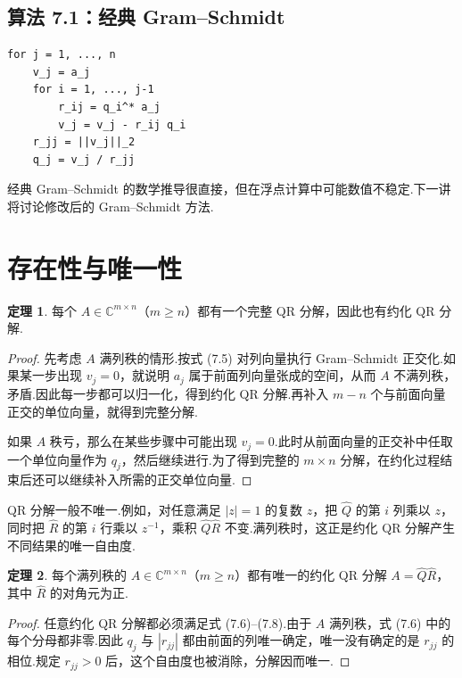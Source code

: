 \documentclass[UTF8,fontset=none,12pt]{ctexart}
\newcommand{\C}{\mathbb{C}}
\theoremstyle{definition}
\newtheorem{theorem}{定理}
\begin{document}
\subsection*{算法 7.1：经典 Gram--Schmidt}

\begin{verbatim}
for j = 1, ..., n
    v_j = a_j
    for i = 1, ..., j-1
        r_ij = q_i^* a_j
        v_j = v_j - r_ij q_i
    r_jj = ||v_j||_2
    q_j = v_j / r_jj
\end{verbatim}

经典 Gram--Schmidt 的数学推导很直接，但在浮点计算中可能数值不稳定.下一讲将讨论修改后的 Gram--Schmidt 方法.

\section*{存在性与唯一性}

\begin{theorem}
每个 $A\in\C^{m\times n}$（$m\ge n$）都有一个完整 QR 分解，因此也有约化 QR 分解.
\end{theorem}

\begin{proof}
先考虑 $A$ 满列秩的情形.按式 (7.5) 对列向量执行 Gram--Schmidt 正交化.如果某一步出现 $v_j=0$，就说明 $a_j$ 属于前面列向量张成的空间，从而 $A$ 不满列秩，矛盾.因此每一步都可以归一化，得到约化 QR 分解.再补入 $m-n$ 个与前面向量正交的单位向量，就得到完整分解.

如果 $A$ 秩亏，那么在某些步骤中可能出现 $v_j=0$.此时从前面向量的正交补中任取一个单位向量作为 $q_j$，然后继续进行.为了得到完整的 $m\times n$ 分解，在约化过程结束后还可以继续补入所需的正交单位向量.
\end{proof}

QR 分解一般不唯一.例如，对任意满足 $|z|=1$ 的复数 $z$，把 $\widehat Q$ 的第 $i$ 列乘以 $z$，同时把 $\widehat R$ 的第 $i$ 行乘以 $z^{-1}$，乘积 $\widehat Q\widehat R$ 不变.满列秩时，这正是约化 QR 分解产生不同结果的唯一自由度.

\begin{theorem}
每个满列秩的 $A\in\C^{m\times n}$（$m\ge n$）都有唯一的约化 QR 分解 $A=\widehat Q\widehat R$，其中 $\widehat R$ 的对角元为正.
\end{theorem}

\begin{proof}
任意约化 QR 分解都必须满足式 (7.6)--(7.8).由于 $A$ 满列秩，式 (7.6) 中的每个分母都非零.因此 $q_j$ 与 $|r_{jj}|$ 都由前面的列唯一确定，唯一没有确定的是 $r_{jj}$ 的相位.规定 $r_{jj}>0$ 后，这个自由度也被消除，分解因而唯一.
\end{proof}
\end{document}
